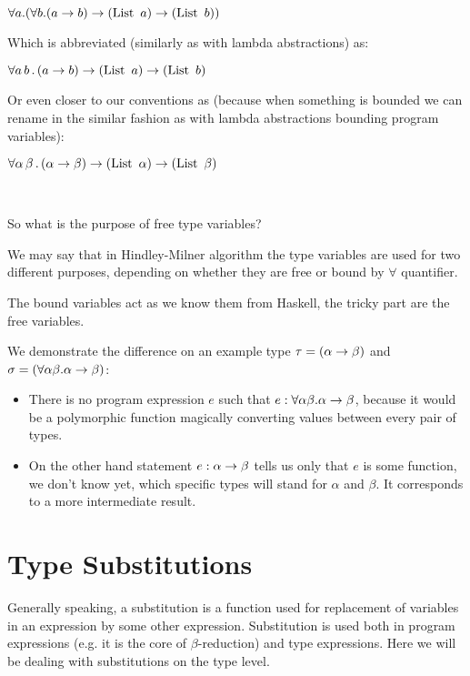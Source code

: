 \documentclass[a4paper,oneside]{memoir}
\begin{document}
$\forall a . (\forall b . (a \rightarrow b) \rightarrow (\operatorname{List}~a) \rightarrow (\operatorname{List}~b))$

Which is abbreviated (similarly as with lambda abstractions) as:

$\forall a\,b\,.\,(a \rightarrow b) \rightarrow (\operatorname{List}~a) \rightarrow (\operatorname{List}~b)$

Or even closer to our conventions as (because when something is bounded we can rename in the similar fashion as with lambda abstractions bounding program variables):

$\forall \alpha\,\beta\,.\,(\alpha \rightarrow \beta) \rightarrow (\operatorname{List}~\alpha) \rightarrow (\operatorname{List}~\beta)$

~

So what is the purpose of free type variables?

We may say that in Hindley-Milner algorithm the type variables are used for two different purposes, depending on whether they are free or bound by $\forall$ quantifier.

The bound variables act as we know them from Haskell, the tricky part are the free variables.



We demonstrate the difference 
on an example type $\tau = (\alpha \rightarrow \beta)$ and $\sigma = (\forall \alpha \beta . \alpha \rightarrow \beta)$:
\begin{itemize}
\item There is no program expression $e$ such that $e : \forall \alpha \beta . \alpha \rightarrow \beta$, because it would be a polymorphic function magically converting values between every pair of types.
\item On the other hand statement $e : \alpha \rightarrow \beta$ tells us only that $e$ is some function, we don't know yet, which specific types will stand for $\alpha$ and $\beta$. It corresponds to a more intermediate result.    

\end{itemize}





\section{Type Substitutions}

Generally speaking, a substitution is a function used for replacement 
of variables in an expression by some other expression.
Substitution is used both in program expressions 
(e.g. it is the core of $\beta$-reduction) and type expressions.
Here we will be dealing with substitutions on the type level. 
\end{document}
